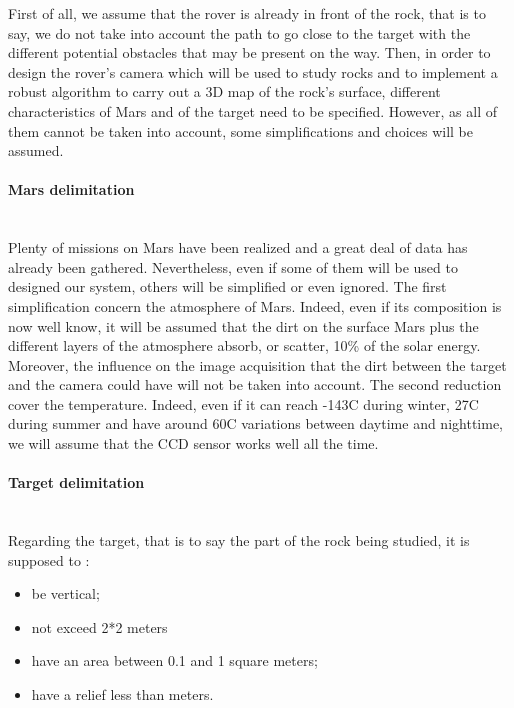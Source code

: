 First of all, we assume that the rover is already in front of the rock, that is to say, we do not take into account the path to go close to the target with the different potential obstacles that may be present on the way. Then, in order to design the rover's camera which will be used to study rocks and to implement a robust algorithm to carry out a 3D map of the rock's surface, different characteristics of Mars and of the target need to be specified. However, as all of them cannot be taken into account, some simplifications and choices will be assumed.

\paragraph*{Mars delimitation}
~\\
Plenty of missions on Mars have been realized and a great deal of data has already been gathered. Nevertheless, even if some of them will be used to designed our system, others will be simplified or even ignored.
The first simplification concern the atmosphere of Mars. Indeed, even if its composition is now well know, it will be assumed that the dirt on the surface Mars plus the different layers of the atmosphere absorb, or scatter, 10\% of the solar energy. Moreover, the influence on the image acquisition that the dirt between the target and the camera could have will not be taken into account.
The second reduction cover the temperature. Indeed, even if it can reach -143\textdegree C during winter, 27\textdegree C during summer and have around 60\textdegree C variations between daytime and nighttime\cite{wiki:temperature}, we will assume that the CCD sensor works well all the time.


\paragraph*{Target delimitation}
~\\
Regarding the target, that is to say the part of the rock being studied, it is supposed to :
\begin{itemize}
\item be vertical;
\item not exceed 2*2 meters
\item have an area between 0.1 and 1 square meters;
\item have a relief less than  meters.
\end{itemize}

